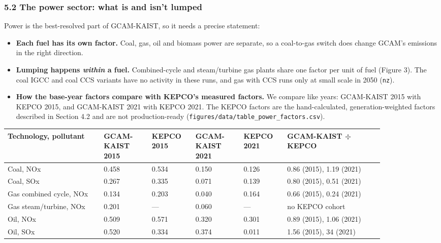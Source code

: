 \hypertarget{the-power-sector-what-is-and-isnt-lumped}{%
\subsubsection*{5.2 The power sector: what is and isn't lumped}\label{the-power-sector-what-is-and-isnt-lumped}}

Power is
the
best-resolved
part of
GCAM-KAIST,
so it
needs a
precise
statement:

\begin{itemize}
\tightlist
\item
  \textbf{Each
  fuel has
  its own
  factor.}
  Coal,
  gas, oil
  and
  biomass
  power
  are
  separate,
  so a
  coal-to-gas
  switch
  does
  change
  GCAM's
  emissions
  in the
  right
  direction.
\item
  \textbf{Lumping
  happens
  \emph{within}
  a fuel.}
  Combined-cycle
  and
  steam/turbine
  gas
  plants
  share
  one
  factor
  per unit
  of fuel
  (Figure
  3). The
  coal
  IGCC and
  coal CCS
  variants
  have no
  activity
  in these
  runs,
  and gas
  with CCS
  runs
  only at
  small
  scale in
  2050
  (\texttt{nz}).
\item
  \textbf{How the base-year factors compare with KEPCO's measured factors.}
  We compare like years: GCAM-KAIST 2015 with KEPCO 2015, and GCAM-KAIST 2021
  with KEPCO 2021. The KEPCO factors are the hand-calculated,
  generation-weighted factors described in Section 4.2 and are not
  production-ready
  (\texttt{figures/\allowbreak{}data/\allowbreak{}table\_\allowbreak{}power\_\allowbreak{}factors.\allowbreak{}csv}).
\end{itemize}

\begin{longtable}[]{@{}p{0.22\linewidth}p{0.11\linewidth}p{0.10\linewidth}p{0.11\linewidth}p{0.10\linewidth}p{0.22\linewidth}@{}}
\toprule\noalign{}
Technology, pollutant & GCAM-KAIST 2015 & KEPCO 2015 & GCAM-KAIST 2021 & KEPCO 2021 & GCAM-KAIST ÷ KEPCO \\
\midrule\noalign{}
\endhead
\bottomrule\noalign{}
\endlastfoot
Coal, NOx & 0.458 & 0.534 & 0.150 & 0.126 & 0.86 (2015), 1.19 (2021) \\
Coal, SOx & 0.267 & 0.335 & 0.071 & 0.139 & 0.80 (2015), 0.51 (2021) \\
Gas combined cycle, NOx & 0.134 & 0.203 & 0.040 & 0.164 & 0.66 (2015), 0.24 (2021) \\
Gas steam/turbine, NOx & 0.201 & --- & 0.060 & --- & no KEPCO cohort \\
Oil, NOx & 0.509 & 0.571 & 0.320 & 0.301 & 0.89 (2015), 1.06 (2021) \\
Oil, SOx & 0.520 & 0.334 & 0.374 & 0.011 & 1.56 (2015), 34 (2021) \\
\end{longtable}

